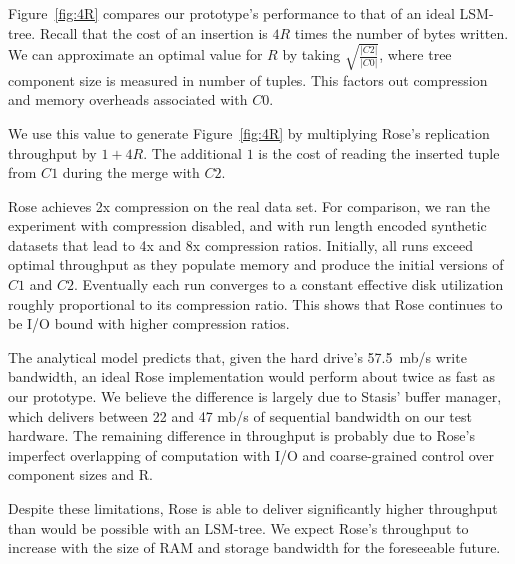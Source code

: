 \documentclass{vldb}
\newcommand{\rows}{Rose\xspace}
\newcommand{\rowss}{Rose's\xspace}
\begin{document}


Figure~\ref{fig:4R} compares our prototype's performance to that of an
ideal LSM-tree.  Recall that the cost of an insertion is $4R$ times
the number of bytes written.  We can approximate an optimal value for
$R$ by taking $\sqrt{\frac{|C2|}{|C0|}}$, where tree component size is
measured in number of tuples.  This factors out compression and memory
overheads associated with $C0$.

We use this value to
generate Figure~\ref{fig:4R} by multiplying \rowss replication
throughput by $1 + 4R$.  The additional $1$ is the cost of reading the
inserted tuple from $C1$ during the merge with $C2$.

\rows achieves 2x compression on the real data set.  For comparison,
we ran the experiment with compression disabled, and with
run length encoded synthetic datasets that lead to 4x and 8x compression
ratios.  Initially, all runs exceed optimal throughput as they
populate memory and produce the initial versions of $C1$ and $C2$.
Eventually each run converges to a constant effective disk
utilization roughly proportional to its compression ratio.  This shows
that \rows continues to be I/O bound with higher compression ratios.

The analytical model predicts that, given the hard drive's 57.5~mb/s
write bandwidth, an ideal \rows implementation would perform about
twice as fast as our prototype.  We believe the difference is largely
due to Stasis' buffer manager, which delivers between 22 and 47 mb/s
of sequential bandwidth on our test hardware.  The remaining
difference in throughput is probably due to \rowss imperfect
overlapping of computation with I/O and coarse-grained control over
component sizes and R.

Despite these limitations, \rows is able to deliver significantly
higher throughput than would be possible with an LSM-tree.  We expect
\rowss throughput to increase with the size of RAM and storage
bandwidth for the foreseeable future.
\end{document}
